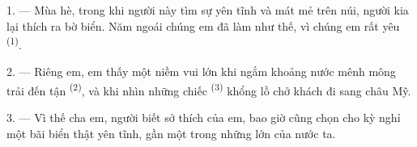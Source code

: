 %
%
%
%

\VUsaut{4.0mm}
\VUsaut{3.0mm}
\VUsaut{3.0mm}

1. --- Mùa hè, trong khi người này tìm sự yên tĩnh và mát mẻ trên núi, người kia lại
thích ra bờ biển. Năm ngoái chúng em đã làm như thế, vì chúng em rất yêu  \textsuperscript{(1)}.

2. --- Riêng em, em thấy một niềm vui lớn khi ngắm khoảng nước mênh mông trải đến tận
 \textsuperscript{(2)}, và khi nhìn những chiếc 
\textsuperscript{(3)} khổng lồ chở khách đi  sang châu Mỹ.

3. --- Vì thế cha em, người biết sở thích của em, bao giờ cũng chọn cho kỳ nghỉ một bãi
biển thật yên tĩnh, gần một trong những  lớn của nước ta.

